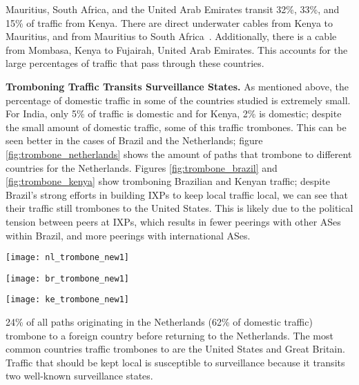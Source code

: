 Mauritius, South Africa, and the United Arab Emirates transit 32\%, 33\%, and 15\% of traffic from Kenya.  There are direct underwater cables from Kenya to Mauritius, and from Mauritius to South Africa~\cite{cablemap}.  Additionally, there is a cable from Mombasa, Kenya to Fujairah, United Arab Emirates.  This accounts for the large percentages of traffic that pass through these countries.

{\bf Tromboning Traffic Transits Surveillance States.}
As mentioned above, the percentage of domestic traffic in some of the countries studied is extremely small.  For India, only 5\% of traffic is domestic and for Kenya, 2\% is domestic; despite the small amount of domestic traffic, some of this traffic trombones.  This can be seen better in the cases of Brazil and the Netherlands; figure \ref{fig:trombone_netherlands} shows the amount of paths that trombone to different countries for the Netherlands.  Figures \ref{fig:trombone_brazil} and \ref{fig:trombone_kenya} show tromboning Brazilian and Kenyan traffic; despite Brazil's strong efforts in building IXPs to keep local traffic local, we can see that their traffic still trombones to the United States.  This is likely due to the political tension between peers at IXPs, which results in fewer peerings with other ASes within Brazil, and more peerings with international ASes. 

\begin{figure*}[!htb]
  \texttt{[image: nl\_trombone\_new1]}
  \caption{The countries that tromboning Netherlands traffic transits.}\label{fig:trombone_netherlands}
\endminipage\hfill
{}
  \texttt{[image: br\_trombone\_new1]}
  \caption{The countries that tromboning Brazilian traffic transits.}\label{fig:trombone_brazil}
\endminipage\hfill
{}%
  \texttt{[image: ke\_trombone\_new1]}
  \caption{The countries that tromboning Kenyan traffic transits.}\label{fig:trombone_kenya}
\endminipage
\end{figure*}


24\% of all paths originating in the Netherlands (62\% of domestic traffic) trombone to a foreign country before returning to the Netherlands. The most common countries traffic trombones to are the United States and Great Britain.  Traffic that should be kept local is susceptible to surveillance because it transits two well-known surveillance states.  

